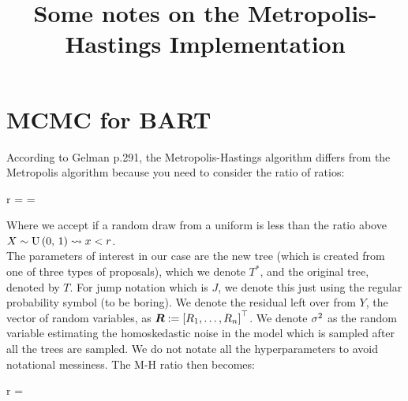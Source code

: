 

\title{Some notes on the Metropolis-Hastings Implementation}

\date{}


\maketitle

\section*{MCMC for BART}

According to Gelman p.291, the Metropolis-Hastings algorithm differs from the Metropolis algorithm because you need to consider the ratio of ratios:

\beqn
r =  = 
\eeqn

Where we accept if a random draw from a uniform is less than the ratio above \ie $X \sim \mathrm{U}\left(0,\,1\right) \leadsto x < r$. \\

The parameters of interest in our case are the new tree (which is created from one of three types of proposals), which we denote $T^*$, and the original tree, denoted by $T$. For jump notation which is $J$, we denote this just using the regular probability symbol (to be boring). We denote the residual left over from $Y$, the vector of random variables, as $\boldsymbol{R} := \left[R_1, \ldots, R_n\right]^\top$. We denote $\sigma^2$ as the random variable estimating the homoskedastic noise in the model which is sampled after all the trees are sampled. We do not notate all the hyperparameters to avoid notational messiness. The M-H ratio then becomes:

\beqn
r =  
\eeqn



